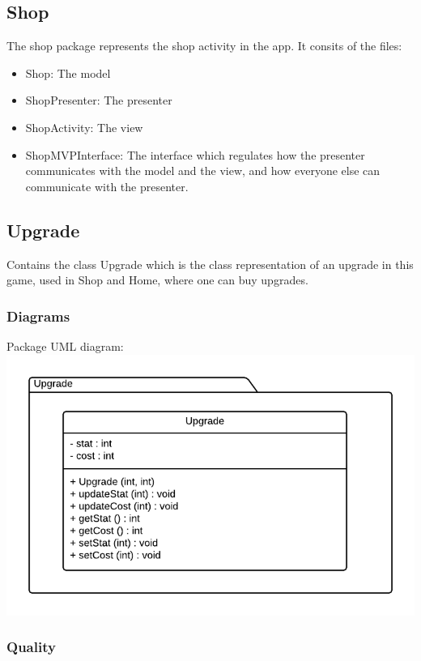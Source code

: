 \documentclass{article}
\begin{document}
\subsection{Shop}
The shop package represents the shop activity in the app. It consits of the files:
\begin{itemize}
    \item Shop: The model
    \item ShopPresenter: The presenter
    \item ShopActivity: The view
    \item ShopMVPInterface: The interface which regulates how the presenter communicates with the model and the view, and how everyone else can communicate with the presenter.
\end{itemize}

\subsection{Upgrade}
Contains the class Upgrade which is the class representation of an upgrade in this game, used in Shop and Home, where one can buy upgrades.

\subsubsection{Diagrams}
\begin{center}
    Package UML diagram:
    \includegraphics[scale=0.5]{uml/upgradeUml.png}
\end{center}

\subsubsection{Quality}
\end{document}

